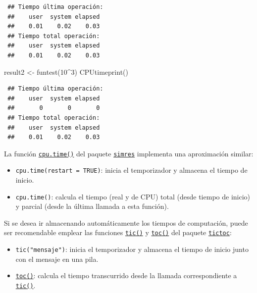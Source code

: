 \documentclass[
  10pt,
]{book}
\newenvironment{Shaded}{\begin{snugshade}}{\end{snugshade}}
\newcommand{\DecValTok}[1]{\textcolor[rgb]{0.00,0.00,0.81}{#1}}
\newcommand{\FunctionTok}[1]{\textcolor[rgb]{0.00,0.00,0.00}{#1}}
\newcommand{\NormalTok}[1]{#1}
\newcommand{\OtherTok}[1]{\textcolor[rgb]{0.56,0.35,0.01}{#1}}
\newcommand{\SpecialCharTok}[1]{\textcolor[rgb]{0.00,0.00,0.00}{#1}}
\theoremstyle{break}
\theoremstyle{nonumberplain}
\begin{document}
\begin{verbatim}
 ## Tiempo última operación:
 ##    user  system elapsed 
 ##    0.01    0.02    0.03 
 ## Tiempo total operación:
 ##    user  system elapsed 
 ##    0.01    0.02    0.03
\end{verbatim}

\begin{Shaded}
\begin{Highlighting}[]
\NormalTok{result2 }\OtherTok{\textless{}{-}} \FunctionTok{funtest}\NormalTok{(}\DecValTok{10}\SpecialCharTok{\^{}}\DecValTok{3}\NormalTok{)}
\FunctionTok{CPUtimeprint}\NormalTok{()}
\end{Highlighting}
\end{Shaded}

\begin{verbatim}
 ## Tiempo última operación:
 ##    user  system elapsed 
 ##       0       0       0 
 ## Tiempo total operación:
 ##    user  system elapsed 
 ##    0.01    0.02    0.03
\end{verbatim}

La función \href{https://rubenfcasal.github.io/simres/reference/cpu.time.html}{\texttt{cpu.time()}} del paquete \href{https://rubenfcasal.github.io/simres}{\texttt{simres}} implementa una aproximación similar:

\begin{itemize}
\item
  \texttt{cpu.time(restart\ =\ TRUE)}: inicia el temporizador y almacena el tiempo de inicio.
\item
  \texttt{cpu.time()}: calcula el tiempo (real y de CPU) total (desde tiempo de inicio) y parcial (desde la última llamada a esta función).
\end{itemize}

Si se desea ir almacenando automáticamente los tiempos de computación, puede ser recomendable emplear las funciones \href{https://rdrr.io/pkg/tictoc/man/tic.html}{\texttt{tic()}} y \href{https://rdrr.io/pkg/tictoc/man/tic.html}{\texttt{toc()}} del paquete \href{https://github.com/jabiru/tictoc}{\texttt{tictoc}}:

\begin{itemize}
\item
  \texttt{tic("mensaje")}: inicia el temporizador y almacena el tiempo de inicio junto con el mensaje en una pila.
\item
  \href{https://rdrr.io/pkg/tictoc/man/tic.html}{\texttt{toc()}}: calcula el tiempo transcurrido desde la llamada correspondiente a \href{https://rdrr.io/pkg/tictoc/man/tic.html}{\texttt{tic()}}.
\end{itemize}
\end{document}

